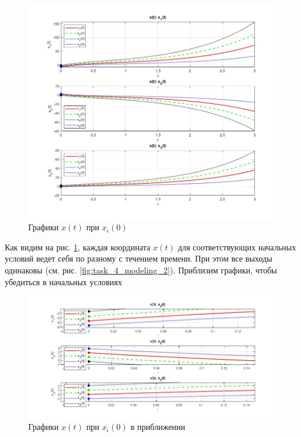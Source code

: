 \documentclass[a4paper, 12pt]{article}
\begin{document}
    \begin{figure}[H]
        \centering
        \includegraphics[scale=0.5]{task_4_x_t_x_i.jpg}
        \captionsetup{skip=0pt}
        \caption{Графики $x(t)$ при $x_i(0)$}
        \label{fig:task_4_modeling_3}
    \end{figure}
    \noindent Как видим на рис. \ref{fig:task_4_modeling_3}, каждая координата $x(t)$ для соответствующих начальных условий
    ведет себя по разному с течением времени. При этом все выходы одинаковы (см. рис. \ref{fig:task_4_modeling_2}).
    Приблизим графики, чтобы убедиться в начальных условиях
    \begin{figure}[H]
        \centering
        \includegraphics[scale=0.52]{task_4_x_t_x_i_close.jpg}
        \captionsetup{skip=0pt}
        \caption{Графики $x(t)$ при $x_i(0)$ в приближении}
        \label{fig:task_4_modeling_4}
    \end{figure}
\end{document}
